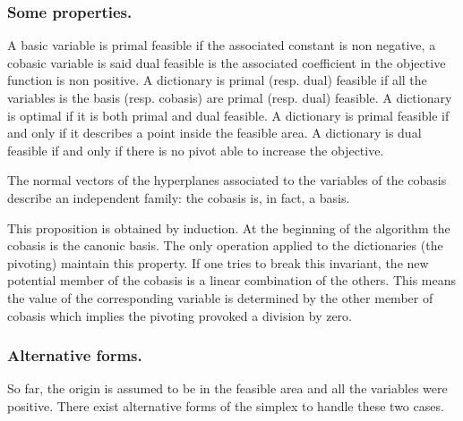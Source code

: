 



\subsubsection{Some properties.}
A basic variable is primal feasible if the associated constant is non negative, a cobasic variable is said dual feasible is the associated coefficient in the objective function is non positive. A dictionary is primal (resp. dual) feasible if all the variables is the basis (resp. cobasis) are primal (resp. dual) feasible. A dictionary is optimal if it is both primal and dual feasible. A dictionary is primal feasible if and only if it describes a point inside the feasible area. A dictionary is dual feasible if and only if there is no pivot able to increase the objective.

\begin{proposition}
The normal vectors of the hyperplanes associated to the variables of the cobasis describe an independent family: the cobasis is, in fact, a basis.
\end{proposition}
\vspace*{-0.1cm}
This proposition is obtained by induction. At the beginning of the algorithm the cobasis is the canonic basis. The only operation applied to the dictionaries (the pivoting) maintain this property. If one tries to break this invariant, the new potential member of the cobasis is a linear combination of the others. This means the value of the corresponding variable is determined by the other member of cobasis which implies the pivoting provoked a division by zero.


\subsubsection{Alternative forms.}
\label{section_altsimplex}
So far, the origin is assumed to be in the feasible area and all the variables were positive. There exist alternative forms of the simplex to handle these two cases.

